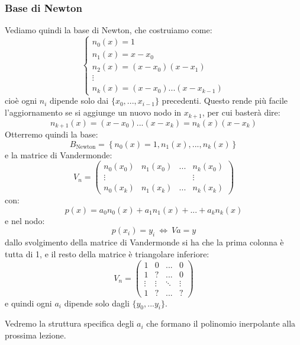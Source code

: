 \documentclass[a4paper,11pt]{article}
\begin{document}
\subsubsection{Base di Newton}
Vediamo quindi la base di Newton, che costruiamo come:
\[
	\begin{cases}
			n_0(x) = 1 \\
			n_1(x) = x - x_0 \\
			n_2(x) = (x - x_0)(x - x_1) \\
			\vdots \\
			n_k(x) = (x - x_0) ... (x - x_{k - 1})
	\end{cases}
\]
cioè ogni $n_i$ dipende solo dai $\{ x_0, ..., x_{i - 1} \}$ precedenti.
Questo rende più facile l'aggiornamento se si aggiunge un nuovo nodo in $x_{k + 1}$, per cui basterà dire:
$$
n_{k + 1}(x) = (x - x_0) ... (x - x_k) = n_k(x) (x - x_k)
$$
Otterremo quindi la base:
$$
B_\text{Newton} = \left\{ n_0(x) = 1, n_1(x), ..., n_k(x) \right\}
$$
e la matrice di Vandermonde:
$$
V_n =
\begin{pmatrix}
	n_0(x_0) & n_1(x_0) & ... & n_k(x_0) \\ 
	\vdots & & & \vdots \\
	n_0(x_k) & n_1(x_k) & ... & n_k(x_k)
\end{pmatrix}
$$
con:
$$
p(x) = a_0 n_0(x) + a_1 n_1(x) + ... + a_k n_k(x)
$$
e nel nodo:
$$
p(x_i) = y_i \ \Leftrightarrow \ Va = y
$$
dallo svolgimento della matrice di Vandermonde si ha che la prima colonna è tutta di 1, e il resto della matrice è triangolare inferiore:
$$
V_n =
\begin{pmatrix}
	1 & 0 & ... & 0 \\
	1 & ? & ... & 0 \\
	\vdots & \vdots & \ddots & \vdots \\
	1 & ? & ... & ?
\end{pmatrix}
$$
e quindi ogni $a_i$ dipende solo dagli $\{ y_0, ... y_i \}$.

Vedremo la struttura specifica degli $a_i$ che formano il polinomio inerpolante alla prossima lezione.
\end{document}
